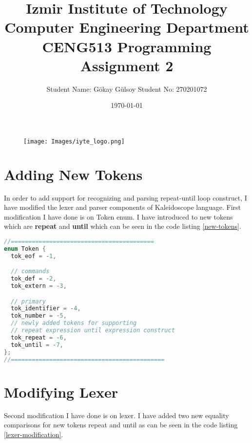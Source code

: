 \documentclass[16pt]{article}
\title{\bf{ Izmir Institute of Technology \\ Computer Engineering Department \\ CENG513 Programming Assignment 2}}
\author{Student Name: Gökay Gülsoy Student No: 270201072}
\date{\today}
\begin{document}
\pagecolor{myGray}
\pagestyle{fancy}
\renewcommand{\headrulewidth}{1pt}
\renewcommand{\footrulewidth}{1pt}
\renewcommand{\headruleskip}{2mm}
\renewcommand{\footruleskip}{2mm}

\fancyhead{} %
\fancyfoot{} %

\maketitle
\begin{figure}[H]
    \centering
    \texttt{[image: Images/iyte\_logo.png]}
\end{figure}

\newpage
\lstlistoflistings
\newpage


\section{Adding New Tokens}
In order to add support for recognizing and parsing repeat-until loop construct, I have modified the lexer\cite{1.Kaleidoscope-Kaleidoscope-Introduction-and-the-Lexer-LLVM19.0.0git-documentation} and parser\cite{2.Kaleidoscope-Implementing-a-Parser-and-AST-LLVM-19.0.0git-documentation} components of Kaleidoscope language. First modification I have done is on Token enum. I have introduced to new tokens which are \textbf{repeat} and \textbf{until} which can be seen in the code listing \ref{new-tokens}.

\vspace{3.5pt}
\begin{lstlisting}[caption= Token for repeat and until added,label=new-tokens,
style=chstyle,language=C++]
//=========================================
enum Token {
  tok_eof = -1,

  // commands
  tok_def = -2,
  tok_extern = -3,

  // primary
  tok_identifier = -4,
  tok_number = -5,
  // newly added tokens for supporting
  // repeat expression until expression construct
  tok_repeat = -6,
  tok_until = -7,
};
//============================================
\end{lstlisting}


\section{Modifying Lexer}
Second modification I have done is on lexer. I have added two new equality comparisons for new tokens repeat and until as can be seen in the code listing \ref{lexer-modification}.
\end{document}
